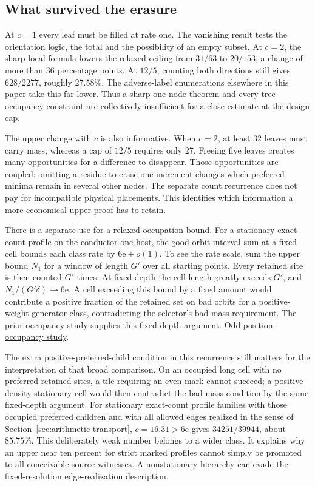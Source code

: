 \subsection{What survived the erasure}
At \(c=1\) every leaf must be filled at rate one. The vanishing result tests the orientation logic, the total and the possibility of an empty subset. At \(c=2\), the sharp local formula lowers the relaxed ceiling from \(31/63\) to \(20/153\), a change of more than 36 percentage points. At \(12/5\), counting both directions still gives \(628/2277\), roughly \(27.58\%\). The adverse-label enumerations elsewhere in this paper take this far lower. Thus a sharp one-node theorem and every tree occupancy constraint are collectively insufficient for a close estimate at the design cap.

The upper change with \(c\) is also informative. When \(c=2\), at least 32 leaves must carry mass, whereas a cap of \(12/5\) requires only 27. Freeing five leaves creates many opportunities for a difference to disappear. Those opportunities are coupled: omitting a residue to erase one increment changes which preferred minima remain in several other nodes. The separate count recurrence does not pay for incompatible physical placements. This identifies which information a more economical upper proof has to retain.

There is a separate use for a relaxed occupation bound. For a stationary exact-count profile on the conductor-one host, the good-orbit interval sum at a fixed cell bounds each class rate by \(6\mathrm e+o(1)\). To see the rate scale, sum the upper bound \(N_1\) for a window of length \(G'\) over all starting points. Every retained site is then counted \(G'\) times. At fixed depth the cell length greatly exceeds \(G'\), and \(N_1/(G'\delta)\to6\mathrm e\). A cell exceeding this bound by a fixed amount would contribute a positive fraction of the retained set on bad orbits for a positive-weight generator class, contradicting the selector's bad-mass requirement. The prior occupancy study supplies this fixed-depth argument. \href{https://github.com/nousentllc/riemann-hypothesis/pull/10}{Odd-position occupancy study}.

The extra positive-preferred-child condition in this recurrence still matters for the interpretation of that broad comparison. On an occupied long cell with no preferred retained sites, a tile requiring an even mark cannot succeed; a positive-density stationary cell would then contradict the bad-mass condition by the same fixed-depth argument. For stationary exact-count profile families with those occupied preferred children and with all allowed edges realized in the sense of Section~\ref{sec:arithmetic-transport}, \(c=16.31>6\mathrm e\) gives \(34251/39944\), about \(85.75\%\). This deliberately weak number belongs to a wider class. It explains why an upper near ten percent for strict marked profiles cannot simply be promoted to all conceivable source witnesses. A nonstationary hierarchy can evade the fixed-resolution edge-realization description.

